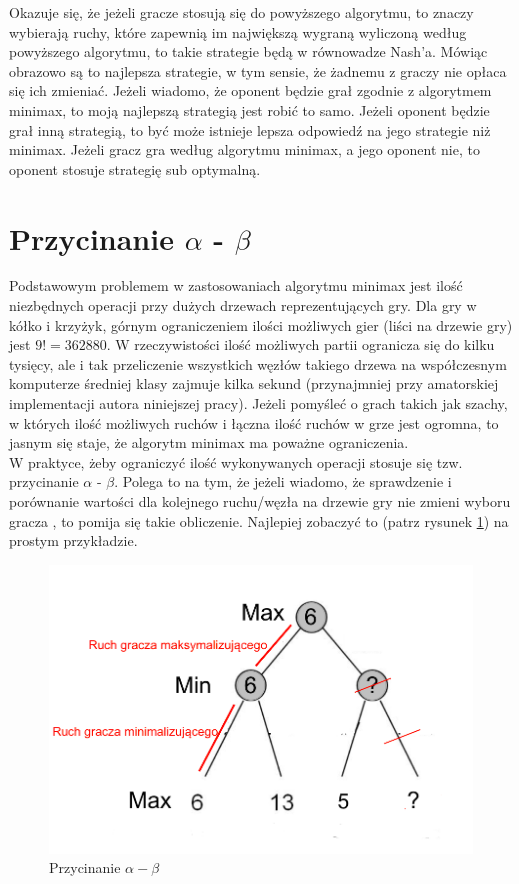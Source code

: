 \documentclass[licencjacka]{pracamgr}
\begin{document}
Okazuje się, że jeżeli gracze stosują się do powyższego algorytmu, to znaczy wybierają ruchy, które zapewnią im największą wygraną wyliczoną według powyższego algorytmu, to takie strategie będą w równowadze Nash'a. Mówiąc obrazowo są  to najlepsza strategie, w tym sensie, że żadnemu z graczy nie opłaca się ich zmieniać. Jeżeli wiadomo, że oponent będzie grał zgodnie z algorytmem minimax, to moją najlepszą strategią jest robić to samo. Jeżeli  oponent będzie grał inną strategią, to być może istnieje lepsza odpowiedź na jego strategie niż minimax. Jeżeli gracz gra według algorytmu minimax, a jego oponent nie, to oponent stosuje strategię sub optymalną. 

\section{Przycinanie $\alpha$ - $\beta$}
Podstawowym problemem w zastosowaniach algorytmu minimax jest ilość niezbędnych operacji przy dużych drzewach reprezentujących gry.  Dla gry w kółko i krzyżyk, górnym ograniczeniem ilości możliwych gier (liści na drzewie gry) jest $9! = 362880$. W rzeczywistości ilość możliwych partii ogranicza się do kilku tysięcy, ale i tak przeliczenie wszystkich węzłów takiego drzewa na współczesnym komputerze średniej klasy zajmuje kilka sekund (przynajmniej przy amatorskiej implementacji autora niniejszej pracy). Jeżeli pomyśleć o grach takich jak szachy, w których ilość możliwych ruchów i łączna ilość ruchów w grze jest ogromna, to jasnym się staje, że algorytm minimax ma poważne ograniczenia.  \\

W praktyce, żeby ograniczyć ilość wykonywanych operacji stosuje się tzw. przycinanie  $\alpha$ - $\beta$. Polega to na tym, że jeżeli wiadomo, że sprawdzenie i porównanie wartości dla kolejnego ruchu/węzła na drzewie gry nie zmieni wyboru gracza , to pomija się takie obliczenie. Najlepiej zobaczyć to (patrz rysunek \ref{Rys3}) na prostym przykładzie. 

\begin{figure}[h!]
	\includegraphics [scale=0.3] {advertise2.png}
	\caption{Przycinanie $\alpha - \beta$}
	\label{Rys3}
\end{figure}
\end{document}
